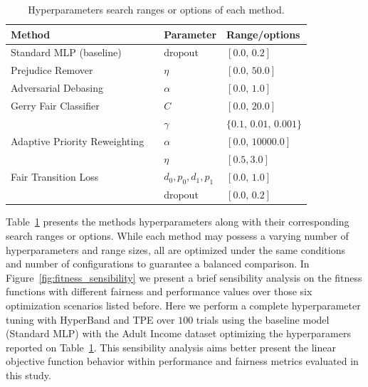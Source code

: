 \begin{table}[ht]
\centering
\caption{Hyperparameters search ranges or options of each method.}\label{tab:hyperparameters}
{\footnotesize
\begin{tabular}{lll}
\toprule
Method & Parameter & Range/options \\ \midrule
 Standard MLP (baseline) & dropout & $[0.0,\,0.2]$  \vspace{1ex} \\
 Prejudice Remover~\citep{Kamishima2012} & $\eta$ & $[0.0,\,50.0]$ \vspace{1ex} \\
 Adversarial Debasing~\citep{Zhang2018}& $\alpha$ & $[0.0,\,1.0]$  \vspace{1ex} \\
 Gerry Fair Classifier~\citep{kearns18a} & $C$ & $[0.0,\,20.0]$ \\
 &  $\gamma$ & $\{0.1,\,0.01,\,0.001\}$ \vspace{1ex} \\
 Adaptive Priority Reweighting~~\citep{HuXT23} & $\alpha$ & $[0.0,\,10000.0]$ \\
 &  $\eta$ & $[0.5, 3.0]$ \vspace{1ex} \\
 Fair Transition Loss & $d_0,p_0,d_1,p_1$ & $[0.0,\,1.0]$ \\
 &  dropout & $[0.0,\,0.2]$ \\
\bottomrule
\end{tabular}
}
\end{table}

Table~\ref{tab:hyperparameters} presents the methods hyperparameters along with their corresponding search ranges or options. While each method may possess a varying number of hyperparameters and range sizes, all are optimized under the same conditions and number of configurations to guarantee a balanced comparison. In Figure~\ref{fig:fitness_sensibility} we present a brief sensibility analysis on the fitness functions with different fairness and performance values over those six optimization scenarios listed before. Here we perform a complete hyperparameter tuning with HyperBand and TPE over $100$ trials using the baseline model (Standard MLP) with the Adult Income dataset optimizing the hyperparamers reported on Table~\ref{tab:hyperparameters}. This sensibility analysis aims better present the linear objective function behavior within performance and fairness metrics evaluated in this study.

